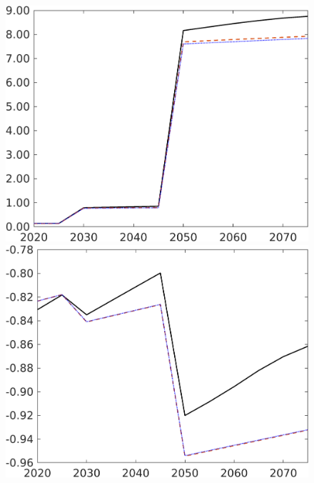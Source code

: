 \begin{figure}[h!!]
\begin{minipage}[]{0.32\textwidth}
	\end{minipage}
	\begin{minipage}[]{0.32\textwidth}
		\includegraphics[width=1\textwidth]{../../codding_model/own_basedOnFried/optimalPol_190722_tidiedUp/figures/all_July22/GFF_CompEffOPT_T_NoTaus_pol4_spillover0_noskill0_sep1_xgrowth0_etaa0.79_lgd0_lff0.png}
	\end{minipage}
	\begin{minipage}[]{0.32\textwidth}
		\includegraphics[width=1\textwidth]{../../codding_model/own_basedOnFried/optimalPol_190722_tidiedUp/figures/all_July22/SWF_CompEffOPT_T_NoTaus_pol4_spillover0_noskill0_sep1_xgrowth0_etaa0.79_lgd0_lff0.png}
	\end{minipage}
\end{figure}

